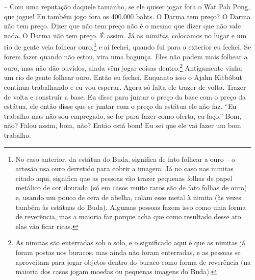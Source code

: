 -- Com uma reputação daquele tamanho, se ele quiser jogar fora o
Wat Pah Pong, que jogue! Eu também jogo fora os 400.000 bahts. O Darma
tem preço? O Darma não tem preço. Dizer que não tem preço não é o mesmo
que dizer que não vale nada. O Darma não tem preço. É assim. Já as
\emph{nimitas}, colocamos no lugar e um rio de gente veio folhear
ouro,\footnote{No caso anterior, da estátua do Buda, significa de fato
folhear a ouro – o artesão usa ouro derretido para cobrir a imagem. Já
no caso nas nimitas citado aqui, significa que as pessoas vão trazer
pequenas folhas de papel metálico de cor dourada (só em casos muito
raros são de fato folhas de ouro) e, usando um pouco de cera de abelha,
colam esse metal à nimita (às vezes também às estátuas do Buda).
Algumas pessoas fazem isso como uma forma de reverência, mas a maioria
faz porque acha que como resultado desse ato elas vão ficar ricas.} e
aí fechei, quando fui para o exterior eu fechei. Se forem fazer quando
não estou, vira uma bagunça. Eles não podem mais folhear a ouro, mas
não dão ouvidos, ainda vêm jogar coisas dentro.\footnote{As nimitas são
enterradas sob o solo, e o significado aqui é que as nimitas já foram
postas nos buracos, mas ainda não foram enterradas, e as pessoas se
aproveitam para jogar objetos dentro do buraco como forma de reverência
(na maioria dos casos jogam moedas ou pequenas imagens do Buda).}
Antigamente vinha um rio de gente folhear ouro. Então eu fechei.
Enquanto isso o Ajahn Kitbóbut continua trabalhando e eu vou esperar.
Agora só falta ele trazer de volta. Trazer de volta e construir a base.
Eu disse para juntar o preço da base com o preço da estátua, ele então
disse que se juntar com o preço da estátua ele não faz. “Eu trabalho
mas não sou empregado, se for para fazer como oferta, eu faço.” Bom,
não? Falou assim, bom, não? Então está bom! Eu sei que ele vai fazer um
bom trabalho.

